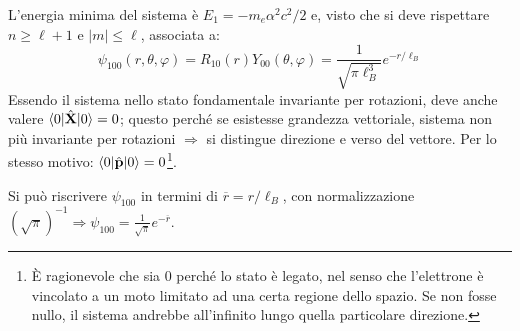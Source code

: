 \documentclass[10pt, a4paper]{scrartcl}
\numberwithin{equation}{subsection}
\theoremstyle{style2}
\theoremstyle{style1}
\begin{document}
L'energia minima del sistema \`e $E_1 = - m_e \alpha ^2 c^2 / 2$ e, visto che si deve rispettare $n\ge \ell +1$ e $\lvert m \rvert \le  \ell $, associata a:
\begin{equation}
	\psi _{100} (r,\theta ,\varphi ) = R_{10} (r) Y_{00} (\theta ,\varphi ) = \frac{1}{\sqrt{\pi \ell _B^3} } e^{- r / \ell _B} 
\end{equation}
Essendo il sistema nello stato fondamentale invariante per rotazioni, deve anche valere $\braket{0|\hat{\mathbf{X} }|0} = 0$; questo perch\'e se esistesse grandezza vettoriale, sistema non pi\`u invariante per rotazioni $\Rightarrow $ si distingue direzione e verso del vettore. Per lo stesso motivo: $\braket{0|\hat{\mathbf{p} }|0}  =0$\footnote{\`E ragionevole che sia $0$ perch\'e lo stato \`e legato, nel senso che l'elettrone \`e vincolato a un moto limitato ad una certa regione dello spazio. Se non fosse nullo, il sistema andrebbe all'infinito lungo quella particolare direzione.}.

Si pu\`o riscrivere $\psi _{100} $ in termini di $\overline{r} = r / \ell _B$, con normalizzazione $(\sqrt{\pi} )^{-1} \Rightarrow \psi _{100} = \frac{1}{\sqrt{\pi} }e^{ - \overline{r}} $. 
\end{document}
